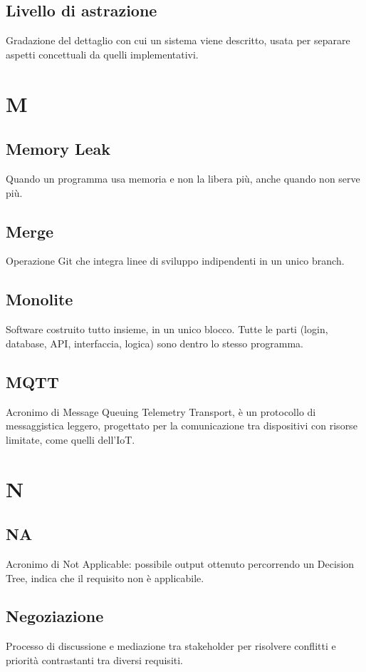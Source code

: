 \documentclass[a4paper,12pt]{article}
\begin{document}
          \subsection*{Livello di astrazione}
			Gradazione del dettaglio con cui un sistema viene descritto, usata per separare aspetti concettuali da quelli implementativi.
        
\newpage
        \section{M}
        
          \subsection*{Memory Leak}
			Quando un programma usa memoria e non la libera più, anche quando non serve più.
          \subsection*{Merge}
			Operazione Git che integra linee di sviluppo indipendenti in un unico branch.
          \subsection*{Monolite}
			Software costruito tutto insieme, in un unico blocco. Tutte le parti (login, database, API, interfaccia, logica) sono dentro lo stesso programma.
          \subsection*{MQTT}
			Acronimo di Message Queuing Telemetry Transport, è un protocollo di messaggistica leggero, progettato per la comunicazione tra dispositivi con risorse limitate, come quelli dell'IoT.
        
\newpage
        \section{N}
        
          \subsection*{NA}
			Acronimo di Not Applicable: possibile output ottenuto percorrendo un Decision Tree, indica che il requisito non è applicabile.
          \subsection*{Negoziazione}
			Processo di discussione e mediazione tra stakeholder per risolvere conflitti e priorità contrastanti tra diversi requisiti.
\end{document}
